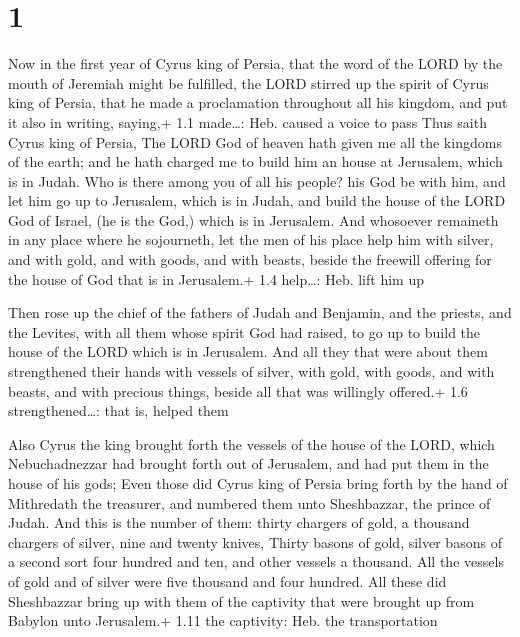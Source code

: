\hypertarget{section}{%
\section{1}\label{section}}

 Now in the first year of Cyrus king of Persia, that the
word of the LORD by the mouth of Jeremiah might be fulfilled, the LORD
stirred up the spirit of Cyrus king of Persia, that he made a
proclamation throughout all his kingdom, and put it also in writing,
saying,+ 1.1 made\ldots: Heb. caused a voice to pass  Thus
saith Cyrus king of Persia, The LORD God of heaven hath given me all the
kingdoms of the earth; and he hath charged me to build him an house at
Jerusalem, which is in Judah.  Who is there among you of all
his people? his God be with him, and let him go up to Jerusalem, which
is in Judah, and build the house of the LORD God of Israel, (he is the
God,) which is in Jerusalem.  And whosoever remaineth in any
place where he sojourneth, let the men of his place help him with
silver, and with gold, and with goods, and with beasts, beside the
freewill offering for the house of God that is in Jerusalem.+ 1.4
help\ldots: Heb. lift him up

 Then rose up the chief of the fathers of Judah and
Benjamin, and the priests, and the Levites, with all them whose spirit
God had raised, to go up to build the house of the LORD which is in
Jerusalem.  And all they that were about them strengthened
their hands with vessels of silver, with gold, with goods, and with
beasts, and with precious things, beside all that was willingly
offered.+ 1.6 strengthened\ldots: that is, helped them

 Also Cyrus the king brought forth the vessels of the
house of the LORD, which Nebuchadnezzar had brought forth out of
Jerusalem, and had put them in the house of his gods;  Even
those did Cyrus king of Persia bring forth by the hand of Mithredath the
treasurer, and numbered them unto Sheshbazzar, the prince of Judah.
 And this is the number of them: thirty chargers of gold, a
thousand chargers of silver, nine and twenty knives, 
Thirty basons of gold, silver basons of a second sort four hundred and
ten, and other vessels a thousand.  All the vessels of gold
and of silver were five thousand and four hundred. All these did
Sheshbazzar bring up with them of the captivity that were brought up
from Babylon unto Jerusalem.+ 1.11 the captivity: Heb. the
transportation

